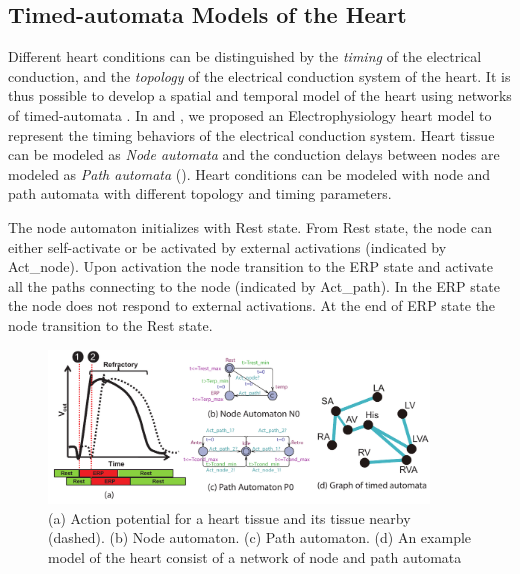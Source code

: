 \subsection{Timed-automata Models of the Heart}
\label{labeledGraph}
Different heart conditions can be distinguished by the \emph{timing} of the electrical conduction, and the \emph{topology} of the electrical conduction system of the heart. It is thus possible to develop a spatial and temporal model of the heart using networks of timed-automata \cite{timed_automata}. In \cite{VHM_proc} and \cite{sttt13}, we proposed an Electrophysiology heart model to represent the timing behaviors of the electrical conduction system. Heart tissue can be modeled as \emph{Node automata} and the conduction delays between nodes are modeled as \emph{Path automata} (). Heart conditions can be modeled with node and path automata with different topology and timing parameters.

The node automaton initializes with \textsf{Rest} state.
From \textsf{Rest} state, the node can either self-activate or be activated by external activations (indicated by Act\_node). Upon activation the node transition to the \textsf{ERP} state and activate all the paths connecting to the node (indicated by Act\_path). 
In the \textsf{ERP} state the node does not respond to external activations. At the end of \textsf{ERP} state the node transition to the \textsf{Rest} state. 
\begin{figure}[!t]
	\centering
	\includegraphics[width=0.9\textwidth]{figs/init_abs.pdf}
	\caption{\small (a) Action potential for a heart tissue and its tissue nearby (dashed). (b) Node automaton. (c) Path automaton. (d) An example model of the heart consist of a network of node and path automata}
	\label{fig:nodepathTA}
\end{figure}


